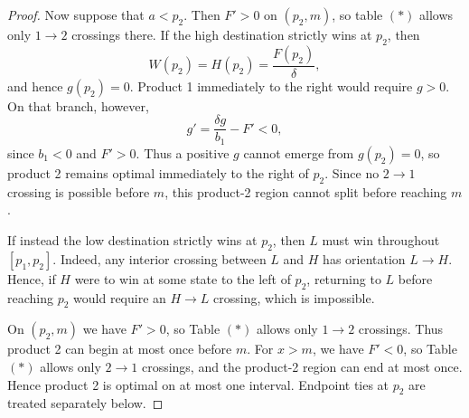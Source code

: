 \documentclass[11pt]{article}
\begin{document}
\begin{proof}
Now suppose that $a<p_2$. Then $F'>0$ on $(p_2,m)$, so table $(*)$ allows
only $1\to2$ crossings there. If the high destination strictly wins at
$p_2$, then
\begin{equation*}
    W(p_2)=H(p_2)=\frac{F(p_2)}{\delta},
\end{equation*}
and hence $g(p_2)=0$. Product 1 immediately to the right would require
$g>0$. On that branch, however,
\begin{equation*}
    g'=\frac{\delta g}{b_1}-F'<0,
\end{equation*}
since $b_1<0$ and $F'>0$. Thus a positive $g$ cannot emerge from $g(p_2)=0$, so product 2 remains optimal immediately to the right of $p_2$. Since no $2\to1$ crossing is possible before $m$, this product-2
region cannot split before reaching $m$.


\begin{figure}[H]
\centering
{}
\end{figure}

If instead the low destination strictly wins at $p_2$, then $L$ must win throughout $[p_1,p_2]$. Indeed, any interior crossing between $L$ and $H$ has orientation $L\to H$. Hence, if $H$ were to win at some state to the left of $p_2$, returning to $L$ before reaching $p_2$ would require an $H\to L$ crossing, which is impossible.

On $(p_2,m)$ we have $F'>0$, so Table $(*)$ allows only $1\to2$ crossings. Thus product 2 can begin at most once before $m$. For $x>m$, we have $F'<0$, so Table $(*)$ allows only $2\to1$ crossings, and the product-2 region can end at most once. Hence product 2 is optimal on at most one interval. Endpoint ties at $p_2$ are treated separately below.


\end{proof}
\end{document}
